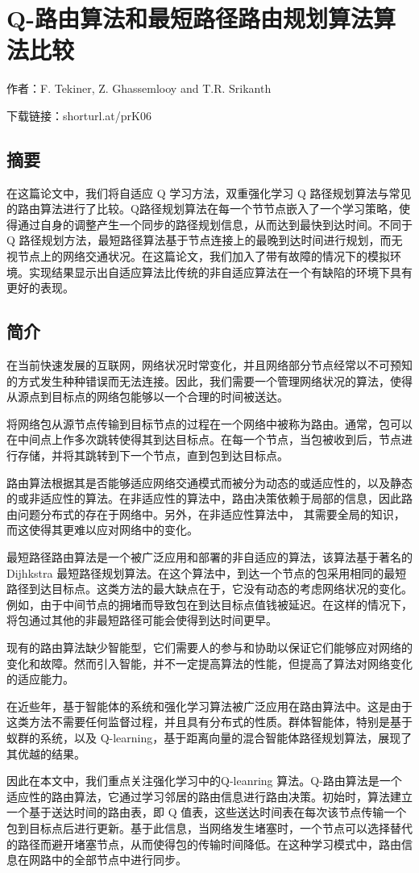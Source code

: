 \documentclass{standalone}
\begin{document}
\thesistranslationchinese

\section*{Q-路由算法和最短路径路由规划算法算法比较}
作者：F. Tekiner, Z. Ghassemlooy and T.R. Srikanth\par
下载链接：shorturl.at/prK06
\subsection*{摘要}
在这篇论文中，我们将自适应 Q 学习方法，双重强化学习 Q 路径规划算法与常见的路由算法进行了比较。Q路径规划算法在每一个节节点嵌入了一个学习策略，使得通过自身的调整产生一个同步的路径规划信息，从而达到最快到达时间。不同于 Q 路径规划方法，最短路径算法基于节点连接上的最晚到达时间进行规划，而无视节点上的网络交通状况。在这篇论文，我们加入了带有故障的情况下的模拟环境。实现结果显示出自适应算法比传统的非自适应算法在一个有缺陷的环境下具有更好的表现。
\subsection*{简介}
在当前快速发展的互联网，网络状况时常变化，并且网络部分节点经常以不可预知的方式发生种种错误而无法连接。因此，我们需要一个管理网络状况的算法，使得从源点到目标点的网络包能够以一个合理的时间被送达。\par
将网络包从源节点传输到目标节点的过程在一个网络中被称为路由。通常，包可以在中间点上作多次跳转使得其到达目标点。在每一个节点，当包被收到后，节点进行存储，并将其跳转到下一个节点，直到包到达目标点。\par
路由算法根据其是否能够适应网络交通模式而被分为动态的或适应性的，以及静态的或非适应性的算法。在非适应性的算法中，路由决策依赖于局部的信息，因此路由问题分布式的存在于网络中。另外，在非适应性算法中， 其需要全局的知识，而这使得其更难以应对网络中的变化。\par
最短路径路由算法是一个被广泛应用和部署的非自适应的算法，该算法基于著名的 Dijhkstra 最短路径规划算法。在这个算法中，到达一个节点的包采用相同的最短路径到达目标点。这类方法的最大缺点在于，它没有动态的考虑网络状况的变化。例如，由于中间节点的拥堵而导致包在到达目标点值钱被延迟。在这样的情况下，将包通过其他的非最短路径可能会使得到达时间更早。\par
现有的路由算法缺少智能型，它们需要人的参与和协助以保证它们能够应对网络的变化和故障。然而引入智能，并不一定提高算法的性能，但提高了算法对网络变化的适应能力。\par
在近些年，基于智能体的系统和强化学习算法被广泛应用在路由算法中。这是由于这类方法不需要任何监督过程，并且具有分布式的性质。群体智能体，特别是基于蚁群的系统，以及 Q-learning，基于距离向量的混合智能体路径规划算法，展现了其优越的结果。\par
因此在本文中，我们重点关注强化学习中的Q-leanring 算法。Q-路由算法是一个适应性的路由算法，它通过学习邻居的路由信息进行路由决策。初始时，算法建立一个基于送达时间的路由表，即 Q 值表，这些送达时间表在每次该节点传输一个包到目标点后进行更新。基于此信息，当网络发生堵塞时，一个节点可以选择替代的路径而避开堵塞节点，从而使得包的传输时间降低。在这种学习模式中，路由信息在网路中的全部节点中进行同步。
\end{document}
